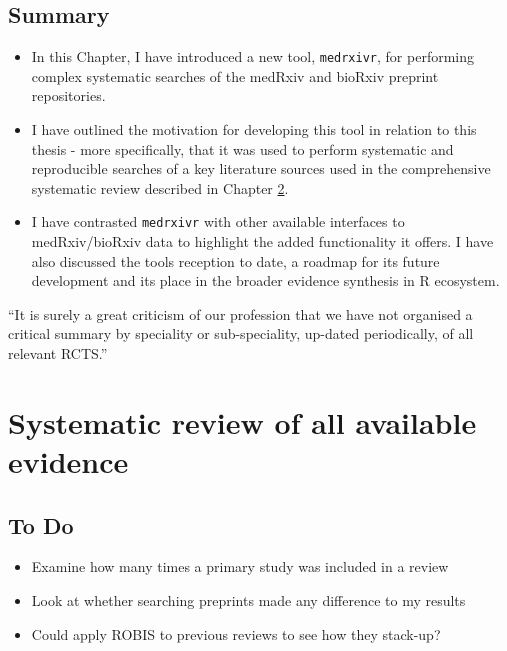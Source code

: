 \documentclass[a4paper, twoside]{templates/ociamthesis}
\providecommand{\tightlist}{%
  \setlength{\itemsep}{0pt}\setlength{\parskip}{0pt}}
\begin{document}
\hypertarget{summary-1}{%
\section{Summary}\label{summary-1}}

\begin{itemize}
\item
  In this Chapter, I have introduced a new tool, \texttt{medrxivr}, for performing complex systematic searches of the medRxiv and bioRxiv preprint repositories.
\item
  I have outlined the motivation for developing this tool in relation to this thesis - more specifically, that it was used to perform systematic and reproducible searches of a key literature sources used in the comprehensive systematic review described in Chapter \ref{sys-rev-heading}.
\item
  I have contrasted \texttt{medrxivr} with other available interfaces to medRxiv/bioRxiv data to highlight the added functionality it offers. I have also discussed the tools reception to date, a roadmap for its future development and its place in the broader evidence synthesis in R ecosystem.
\end{itemize}

\begin{savequote}
``It is surely a great criticism of our profession that we have not
organised a critical summary by speciality or sub-speciality, up-dated
periodically, of all relevant RCTS.''
\end{savequote}



\hypertarget{sys-rev-heading}{%
\chapter{Systematic review of all available evidence}\label{sys-rev-heading}}

\minitoc 

\hypertarget{to-do}{%
\section{To Do}\label{to-do}}

\begin{itemize}
\tightlist
\item
  Examine how many times a primary study was included in a review\\
\item
  Look at whether searching preprints made any difference to my results
\item
  Could apply ROBIS to previous reviews to see how they stack-up?
\end{itemize}
\end{document}
